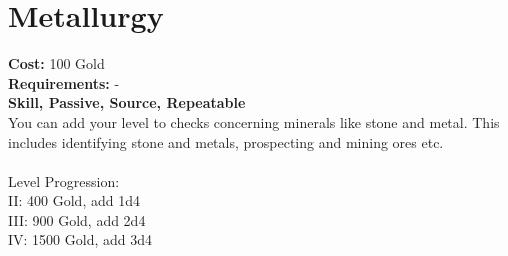\section{Metallurgy}
\textbf{Cost:} 100 Gold\\
\textbf{Requirements:} -\\
\textbf{Skill, Passive, Source, Repeatable}\\
You can add your level to checks concerning minerals like stone and metal. This includes identifying stone and metals, prospecting and mining ores etc.\\
\\
Level Progression:\\
II: 400 Gold, add 1d4\\
III: 900 Gold, add 2d4\\
IV: 1500 Gold, add 3d4\\